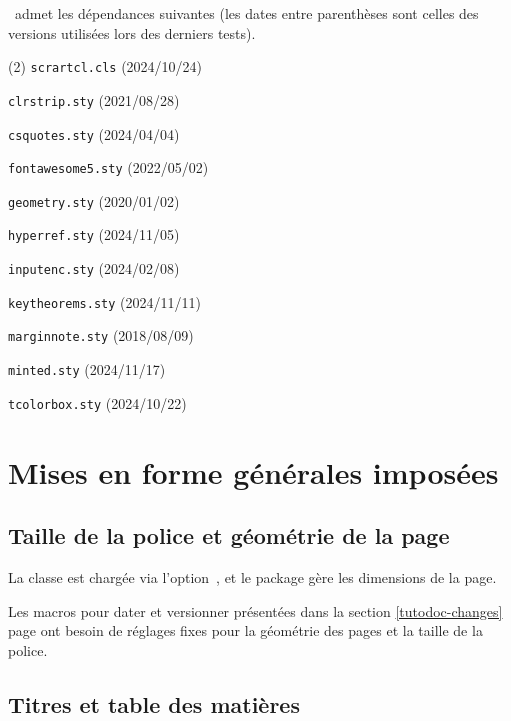 \thisproj\ admet les dépendances suivantes (les dates entre parenthèses sont celles des versions utilisées lors des derniers tests).
%
\begin{tasks}[style=itemize](2)
    \task \texttt{scrartcl.cls}
    \hfill {\small (2024/10/24)}\kern10pt

    \task \texttt{clrstrip.sty}
    \hfill {\small (2021/08/28)}\kern10pt

    \task \texttt{csquotes.sty}
    \hfill {\small (2024/04/04)}\kern10pt

    \task \texttt{fontawesome5.sty}
    \hfill {\small (2022/05/02)}\kern10pt

    \task \texttt{geometry.sty}
    \hfill {\small (2020/01/02)}\kern10pt

    \task \texttt{hyperref.sty}
    \hfill {\small (2024/11/05)}\kern10pt

    \task \texttt{inputenc.sty}
    \hfill {\small (2024/02/08)}\kern10pt

    \task \texttt{keytheorems.sty}
    \hfill {\small (2024/11/11)}\kern10pt

    \task \texttt{marginnote.sty}
    \hfill {\small (2018/08/09)}\kern10pt

    \task \texttt{minted.sty}
    \hfill {\small (2024/11/17)}\kern10pt

    \task \texttt{tcolorbox.sty}
    \hfill {\small (2024/10/22)}\kern10pt
\end{tasks}


\section{Mises en forme générales imposées}

\subsection{Taille de la police et géométrie de la page}

La classe  est chargée via l'option \,, et le package  gère les dimensions de la page.


\begin{tdocwarn}
	Les macros pour dater et versionner présentées dans la section \ref{tutodoc-changes} page \pageref{tutodoc-changes} ont besoin de réglages fixes pour la géométrie des pages et la taille de la police.
\end{tdocwarn}


\subsection{Titres et table des matières}

